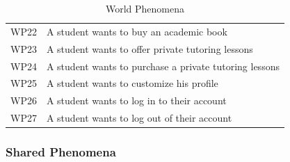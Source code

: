 \documentclass{article}
\begin{document}
\begin{table}[h!]
\begin{tabular}{|c|p{10cm}|}
WP22 & A student wants to buy an academic book \\
WP23 & A student wants to offer private tutoring lessons \\
WP24 & A student wants to purchase a private tutoring lessons \\
WP25 & A student wants to customize his profile \\
WP26 & A student wants to log in to their account \\
WP27 & A student wants to log out of their account \\
\hline
\end{tabular}
\caption{World Phenomena}
\label{tab:world_phenomena}
\end{table}

\clearpage
\subsubsection{Shared Phenomena}
\end{document}
